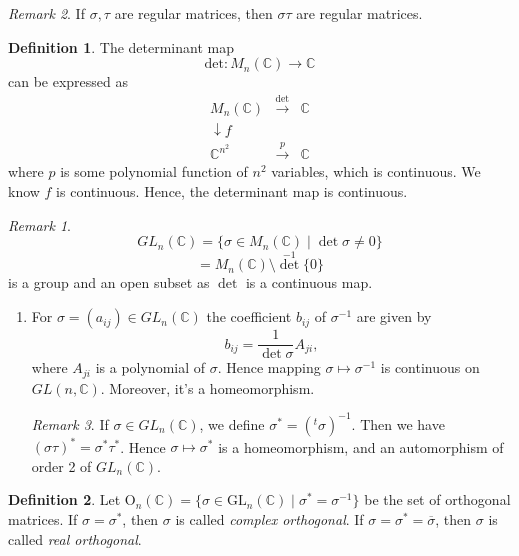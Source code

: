 \documentclass[11pt]{article}
\theoremstyle{definition}
\newtheorem{definition}{Definition}[section]
\theoremstyle{remark}
\newtheorem{remark}{Remark}[section]
\begin{document}
\begin{remark}
If $\sigma, \tau$ are regular matrices, then $\sigma \tau$ are regular matrices.

\begin{definition}
The determinant map
\[
\text{det} : M_n(\mathbb{C}) \to \mathbb{C}
\]
can be expressed as
\[
\begin{array}{ccc}
M_n(\mathbb{C}) & \xrightarrow{\text{det}} & \mathbb{C} \\
\downarrow{f} & & \\
\mathbb{C}^{n^2} & \xrightarrow{p} & \mathbb{C}
\end{array}
\]
where $p$ is some polynomial function of $n^2$ variables, which is continuous. We know $f$ is continuous. Hence, the determinant map is continuous.
\end{definition}

\begin{remark}
\[
GL_n(\mathbb{C}) = \{\sigma \in M_n(\mathbb{C}) \mid \det \sigma \neq 0\}
\]
\[
= M_n(\mathbb{C}) \setminus \det^{-1}\{0\}
\]
is a group and an open subset as $\det$ is a continuous map.
\end{remark}
\end{remark}

\begin{enumerate}
    \item[(ii)] For $\sigma = (a_{ij}) \in GL_n(\mathbb{C})$ the coefficient $b_{ij}$ of $\sigma^{-1}$ are given by
    \[
    b_{ij} = \frac{1}{\det \sigma} A_{ji},
    \]
    where $A_{ji}$ is a polynomial of $\sigma$. Hence mapping $\sigma \mapsto \sigma^{-1}$ is continuous on $GL(n, \mathbb{C})$. Moreover, it's a homeomorphism.

    \begin{remark}
        If $\sigma \in GL_n(\mathbb{C})$, we define $\sigma^* = (^t \sigma)^{-1}$. Then we have $(\sigma \tau)^* = \sigma^* \tau^*$. Hence $\sigma \mapsto \sigma^*$ is a homeomorphism, and an automorphism of order 2 of $GL_n(\mathbb{C})$.
    \end{remark}
\end{enumerate}

\begin{definition}\label{def:orthogonal_matrices}
Let $\mathrm{O}_n(\mathbb{C}) = \{\sigma \in \mathrm{GL}_n(\mathbb{C}) \mid \sigma^* = \sigma^{-1}\}$ be the set of orthogonal matrices. If $\sigma = \sigma^*$, then $\sigma$ is called \emph{complex orthogonal}. If $\sigma = \sigma^* = \overline{\sigma}$, then $\sigma$ is called \emph{real orthogonal}.
\end{definition}
\end{document}
